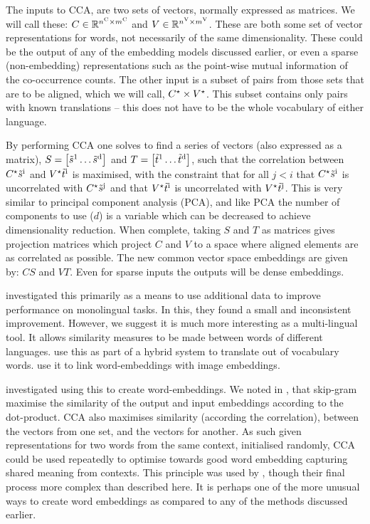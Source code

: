 \documentclass[parskip]{komatufte}
\begin{document}
The inputs to CCA, are two sets of vectors, normally expressed as matrices.
We will call these:
$C \in \mathbb{R}^{\d n_C \times \d m_C}$ and $V \in \mathbb{R}^{\d n_V \times \d m_V}$.
These are both some set of vector representations for words, not necessarily of the same dimensionality.
These could be the output of any of the embedding models discussed earlier,
or even a sparse (non-embedding) representations such as the point-wise mutual information of the co-occurrence counts.
The other input is a subset of pairs from those sets that are to be aligned, which we will call, $\d C_\star \times \d V_\star$.
This subset contains only pairs with known translations -- this does not have to be the whole vocabulary of either language.


%
By performing CCA one solves to find a series of vectors (also expressed as a matrix), $S=\left[ \dv s_1 \ldots \dv s_d \right]$ and $T= \left[ \dv t_1 \ldots \dv t_d \right]$,
such that the correlation between $\d C_\star \dv s_i$ and $\d V_\star \dv t_i$ is maximised,
with the constraint that for all $j<i$ that $\d C_\star \dv s_i$ is uncorrelated with $\d C_\star \dv s_j$  and that  $ \d V_\star \dv t_i$ is uncorrelated with $\d V_\star \dv t_j$.
This is very similar to principal component analysis (PCA), and like PCA the number of components to use ($d$) is a variable which can be decreased to achieve dimensionality reduction.
When complete, taking $S$ and $T$ as matrices gives projection matrices which project $C$ and $V$ to a space where aligned elements are as correlated as possible.
The new common vector space embeddings are given by:
$C S$ and $V T$.
Even for sparse inputs the outputs will be dense embeddings.

\textcite{faruqui2014improving} investigated this primarily as a means to use additional data to improve performance on monolingual tasks.
In this, they found a small and inconsistent improvement.
However, we suggest it is much more interesting as a multi-lingual tool.
It allows similarity measures to be made between words of different languages.
 use this as part of a hybrid system to translate out of vocabulary words.
 use it to link word-embeddings with image embeddings.

 investigated using this to create word-embeddings.
We noted in , that skip-gram maximise the similarity of the output and input embeddings according to the dot-product.
CCA also maximises similarity (according the correlation), between the vectors from one set, and the vectors for another.
As such given representations for two words from the same context, initialised randomly,
CCA could be used repeatedly to optimise towards good word embedding capturing shared meaning from contexts.
This principle was used by , though their final process more complex than described here.
It is perhaps one of the more unusual ways to create word embeddings as compared to any of the methods discussed earlier.
\end{document}
